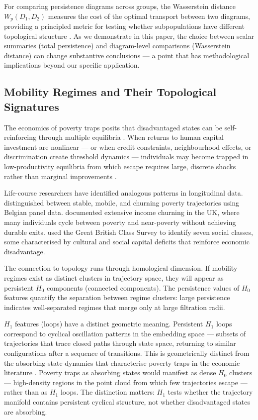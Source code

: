 For comparing persistence diagrams across groups, the Wasserstein distance $W_p(D_1, D_2)$ measures the cost of the optimal transport between two diagrams, providing a principled metric for testing whether subpopulations have different topological structure \citep{turner2014frechet}. As we demonstrate in this paper, the choice between scalar summaries (total persistence) and diagram-level comparisons (Wasserstein distance) can change substantive conclusions --- a point that has methodological implications beyond our specific application.

\subsection{Mobility Regimes and Their Topological Signatures}

The economics of poverty traps posits that disadvantaged states can be self-reinforcing through multiple equilibria \citep{azariadis2005poverty}. When returns to human capital investment are nonlinear --- or when credit constraints, neighbourhood effects, or discrimination create threshold dynamics --- individuals may become trapped in low-productivity equilibria from which escape requires large, discrete shocks rather than marginal improvements \citep{barrett2013economics}.

Life-course researchers have identified analogous patterns in longitudinal data. \citet{vandecasteele2010poverty} distinguished between stable, mobile, and churning poverty trajectories using Belgian panel data. \citet{jenkins2011changing} documented extensive income churning in the UK, where many individuals cycle between poverty and near-poverty without achieving durable exits. \citet{savage2013new} used the Great British Class Survey to identify seven social classes, some characterised by cultural and social capital deficits that reinforce economic disadvantage.

The connection to topology runs through homological dimension. If mobility regimes exist as distinct clusters in trajectory space, they will appear as persistent $H_0$ components (connected components). The persistence values of $H_0$ features quantify the separation between regime clusters: large persistence indicates well-separated regimes that merge only at large filtration radii.

$H_1$ features (loops) have a distinct geometric meaning. Persistent $H_1$ loops correspond to cyclical oscillation patterns in the embedding space --- subsets of trajectories that trace closed paths through state space, returning to similar configurations after a sequence of transitions. This is geometrically distinct from the absorbing-state dynamics that characterise poverty traps in the economic literature \citep{azariadis2005poverty}. Poverty traps as absorbing states would manifest as dense $H_0$ clusters --- high-density regions in the point cloud from which few trajectories escape --- rather than as $H_1$ loops. The distinction matters: $H_1$ tests whether the trajectory manifold contains persistent cyclical structure, not whether disadvantaged states are absorbing.


